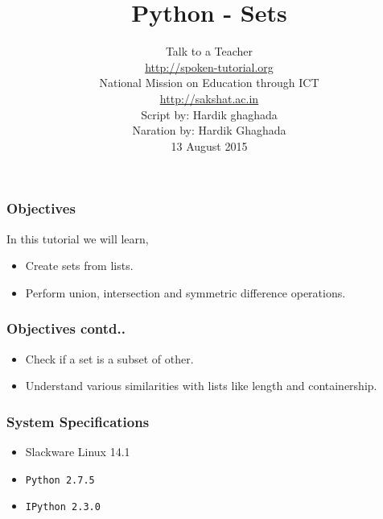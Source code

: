 \documentclass[17pt,compress]{beamer}
\author[FOSSEE]{}
\institute[IIT Bombay]{}
\date[]{}
\begin{document}
\sffamily \bfseries
\title
[Sets]
{Python - Sets}
\author
[FOSSEE, IIT - Bombay]
{\small Talk to a Teacher\\{\color{blue}\url{http://spoken-tutorial.org}}\\National Mission on Education
 through ICT\\{\color{blue}\url{http://sakshat.ac.in}} \\[0.5cm]{\tiny Script by: Hardik ghaghada \\ Naration by: Hardik Ghaghada \\ 13 August 2015}}

\begin{frame}
   \titlepage
\end{frame}
\begin{frame}
\frametitle{Objectives}
\label{sec-2.1}

  In this tutorial we will learn, \pause


\begin{itemize}
\item Create sets from lists.\pause
\item Perform union, intersection and symmetric difference operations.
\end{itemize}
\end{frame}
\begin{frame}
\frametitle{Objectives contd..}
\label{sec-2.2}

\begin{itemize}
\item Check if a set is a subset of other.\pause
\item Understand various similarities with lists like length and containership.
\end{itemize}
\end{frame}
\begin{frame}
\frametitle{System Specifications}\pause
\begin{itemize}
\item Slackware Linux 14.1\pause
\item \texttt{Python 2.7.5} \pause
\item \texttt{IPython 2.3.0}
\end{itemize}
\end{frame}
\end{document}
